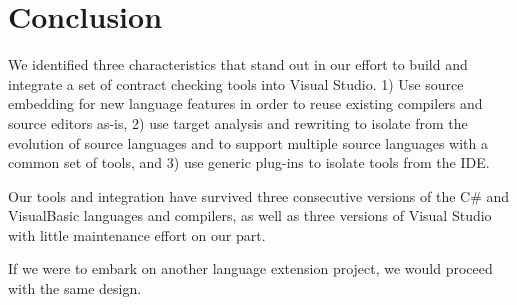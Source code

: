 \documentclass[10pt, conference, compsocconf]{IEEEtran}
\newcommand{\csharp}{C\#}
\begin{document}
%





\section{Conclusion}
\label{sec:conclusion}
\noindent
We identified three characteristics that stand out in our effort to
build and integrate a set of contract checking tools into Visual
Studio. 1) Use source embedding for new language features in order to
reuse existing compilers and source editors as-is, 2) use target
analysis and rewriting to isolate from the evolution of source
languages and to support multiple source languages with a common set
of tools, and 3) use generic plug-ins to isolate tools from the IDE.

Our tools and integration have survived three consecutive versions of
the \csharp{} and VisualBasic languages and compilers, as well as three
versions of Visual Studio with little maintenance effort on our part.

If we were to embark on another language extension project, we would
proceed with the same design.
\end{document}
